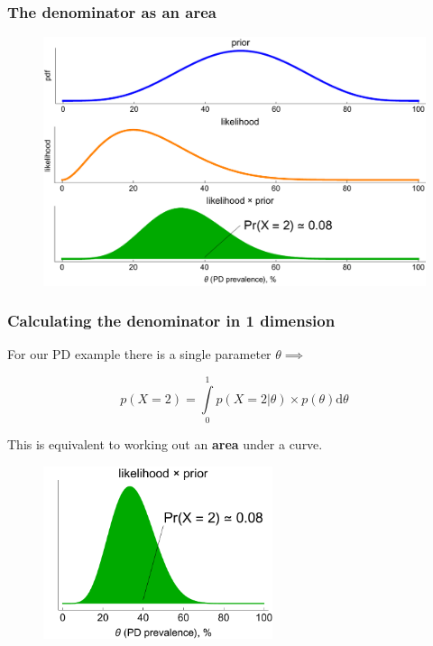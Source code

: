 \documentclass[handout]{beamer}
\begin{document}
\begin{frame}
	\frametitle{The denominator as an area}
	
	\begin{figure}
		\centerline{\includegraphics[width=1\textwidth]{./Animations/lec2_cuckooDenominator2.pdf}}
	\end{figure}
	
\end{frame}

\begin{frame}
	\frametitle{Calculating the denominator in 1 dimension}
For our PD example there is a single parameter $\theta \implies$
	

	\begin{equation}
	p(X=2) = \int\limits_{0}^{1} p(X=2|\theta)\times p(\theta) \mathrm{d}\theta
	\end{equation}
	
	This is equivalent to working out an \textbf{area} under a curve.
	
	\begin{figure}
		\centerline{\includegraphics[width=0.6\textwidth]{./Animations/lec2_cuckooDenominator3.pdf}}
	\end{figure}
	
\end{frame}
\end{document}
